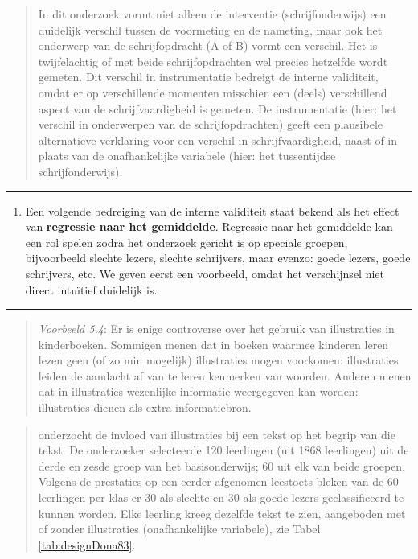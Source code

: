 \documentclass[
]{book}
\providecommand{\tightlist}{%
  \setlength{\itemsep}{0pt}\setlength{\parskip}{0pt}}
\begin{document}
\begin{quote}
In dit onderzoek vormt niet alleen de interventie (schrijfonderwijs) een
duidelijk verschil tussen de voormeting en de nameting, maar ook het
onderwerp van de schrijfopdracht (A of B) vormt een verschil. Het is
twijfelachtig of met beide schrijfopdrachten wel precies hetzelfde wordt
gemeten. Dit verschil in instrumentatie bedreigt de interne validiteit,
omdat er op verschillende momenten misschien een (deels) verschillend
aspect van de schrijfvaardigheid is gemeten. De instrumentatie (hier:
het verschil in onderwerpen van de schrijfopdrachten) geeft een
plausibele alternatieve verklaring voor een verschil in
schrijfvaardigheid, naast of in plaats van de onafhankelijke variabele
(hier: het tussentijdse schrijfonderwijs).
\end{quote}

\begin{center}\rule{0.5\linewidth}{0.5pt}\end{center}

\begin{enumerate}
\def\labelenumi{\arabic{enumi}.}
\setcounter{enumi}{3}
\tightlist
\item
  Een volgende bedreiging van de interne validiteit staat bekend als
  het effect van \textbf{regressie naar het gemiddelde}. Regressie naar het
  gemiddelde kan een rol spelen zodra het onderzoek gericht is op speciale
  groepen, bijvoorbeeld slechte lezers, slechte schrijvers, maar evenzo:
  goede lezers, goede schrijvers, etc. We geven eerst een voorbeeld, omdat
  het verschijnsel niet direct intuïtief duidelijk is.
\end{enumerate}

\begin{center}\rule{0.5\linewidth}{0.5pt}\end{center}

\begin{quote}
\emph{Voorbeeld 5.4}:
Er is enige controverse over het gebruik van illustraties in
kinderboeken. Sommigen menen dat in boeken waarmee kinderen leren lezen
geen (of zo min mogelijk) illustraties mogen voorkomen: illustraties
leiden de aandacht af van te leren kenmerken van woorden. Anderen menen
dat in illustraties wezenlijke informatie weergegeven kan worden:
illustraties dienen als extra informatiebron.
\end{quote}

\begin{quote}
\citep{Dona83} onderzocht de invloed van illustraties bij een tekst op het begrip van
die tekst. De onderzoeker selecteerde 120 leerlingen (uit 1868
leerlingen) uit de derde en zesde groep van het basisonderwijs; 60 uit
elk van beide groepen. Volgens de prestaties op een eerder afgenomen
leestoets bleken van de 60 leerlingen per klas er 30 als slechte en 30
als goede lezers geclassificeerd te kunnen worden. Elke leerling kreeg
dezelfde tekst te zien, aangeboden met of zonder illustraties
(onafhankelijke variabele), zie Tabel \ref{tab:designDona83}.
\end{quote}
\end{document}
